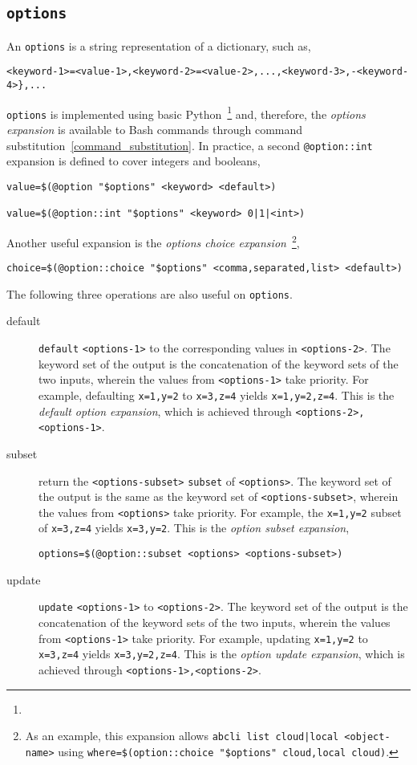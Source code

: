 \subsection{\texttt{options}}
\label{options}

An \texttt{options} is a string representation of a dictionary, such as,
%
\begin{verbatim}
<keyword-1>=<value-1>,<keyword-2>=<value-2>,...,<keyword-3>,-<keyword-4>},...
\end{verbatim}
%
\texttt{options} is implemented using basic Python~\footnote{} and, therefore, the \emph{options expansion} is available to Bash commands through command substitution~\ref{command_substitution}. In practice, a second \texttt{@option::int} expansion is defined to cover integers and booleans,
%
\begin{verbatim}
value=$(@option "$options" <keyword> <default>)

value=$(@option::int "$options" <keyword> 0|1|<int>)
\end{verbatim}
%
Another useful expansion is the \emph{options choice expansion}~\footnote{
As an example, this expansion allows \texttt{abcli list cloud|local <object-name>} using \texttt{where=\$(option::choice "\$options" cloud,local cloud)}.
},
%
\begin{verbatim}
choice=$(@option::choice "$options" <comma,separated,list> <default>)
\end{verbatim}
%
The following three operations are also useful on \texttt{options}.
%
\begin{description}
%
\item[default]{\texttt{default} \texttt{<options-1>} to the corresponding values in \texttt{<options-2>}. The keyword set of the output is the concatenation of the keyword sets of the two inputs, wherein the values from \texttt{<options-1>} take priority. For example, defaulting \texttt{x=1,y=2} to \texttt{x=3,z=4} yields \texttt{x=1,y=2,z=4}. This is the \emph{default option expansion}, which is achieved through \texttt{<options-2>,<options-1>}.}
%
\item[subset]{return the \texttt{<options-subset>} \texttt{subset} of \texttt{<options>}. The keyword set of the output is the same as the keyword set of \texttt{<options-subset>}, wherein the values from \texttt{<options>} take priority. For example, the \texttt{x=1,y=2} subset of \texttt{x=3,z=4} yields \texttt{x=3,y=2}. This is the \emph{option subset expansion},
\begin{verbatim}
options=$(@option::subset <options> <options-subset>)
\end{verbatim}
}
%
\item[update]{\texttt{update} \texttt{<options-1>} to \texttt{<options-2>}. The keyword set of the output is the concatenation of the keyword sets of the two inputs, wherein the values from \texttt{<options-1>} take priority. For example, updating \texttt{x=1,y=2} to \texttt{x=3,z=4} yields \texttt{x=3,y=2,z=4}. This is the \emph{option update expansion}, which is achieved through \texttt{<options-1>,<options-2>}.}
%
\end{description}
